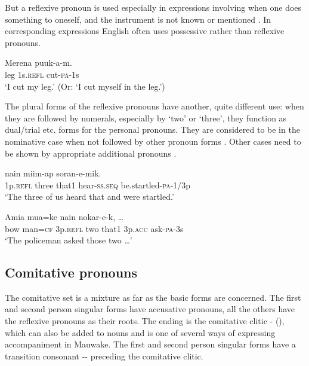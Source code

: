 But a reflexive pronoun is used especially in expressions involving  when one does something to oneself, and the instrument is not known or mentioned . In corresponding expressions English often uses possessive rather than reflexive pronouns.

\ea%
\label{ex:3:x618}
\gll Merena  puuk-a-m. \\
leg 1s.\textsc{refl} cut-\textsc{pa}-1s\\
\glt`I cut my leg.' (Or: `I cut myself in the leg.')
\z

The plural forms of the reflexive pronouns have another, quite different use: when they are followed by numerals, especially by `two' or `three', they function as dual/trial etc. forms for the personal pronouns. They are considered to be in the nominative case when not followed by other pronoun forms . Other cases need to be shown by appropriate additional pronouns .

\ea%
\label{ex:3:x615}
\gll {}  nain miim-ap soran-e-mik. \\
1p.\textsc{refl} three that1 hear-\textsc{ss}.\textsc{seq} be.startled-\textsc{pa}-1/3p\\
\glt`The three of us heard that and were startled.'
\z

\ea%
\label{ex:3:x616}
\gll Amia mua=ke   nain  nokar-e-k, {\dots} \\
bow man=\textsc{cf} 3p.\textsc{refl} two that1 3p.\textsc{acc} ask-\textsc{pa}-3s\\
\glt`The policeman asked those two {\dots}'
\z

\subsection{Comitative pronouns}\label{sec:3.5.9}
{}
The comitative set is a mixture as far as the basic forms are concerned. The first and second person singular forms have accusative pronouns, all the others have the reflexive pronouns as their roots. The ending is the comitative clitic - (), which can also be added to nouns and is one of several ways of expressing accompaniment in Mauwake. The first and second person singular forms have a transition consonant -- preceding the comitative clitic.

